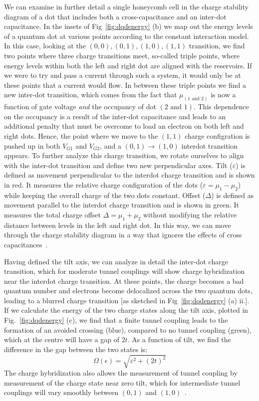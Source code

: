 We can examine in further detail a single honeycomb cell in the charge stability diagram of a dot that includes both a cross-capacitance and an inter-dot capacitance.
In the insets of Fig~\ref{fig:dqdenergy} (b) we map out the energy levels of a quantum dot at various points according to the constant interaction model.
In this case, looking at the $(0, 0), (0, 1), (1, 0), (1, 1)$ transition, we find two points where
three charge transitions meet, so-called triple points, where energy levels within both the left and right dot are aligned
with the reservoirs. If we were to try and pass a current through such a system, it would only be at these points that a
current would flow. In between these triple points we find a new inter-dot transition, which comes from the fact that $\mu_{(1 \textrm{~and~} 2)}$
is now a function of gate voltage \emph{and} the occupancy of dot $(2 \textrm{~and~} 1)$. This dependence on the
occupancy is a result of the inter-dot capacitance and leads to an additional penalty that must be
overcome to load an electron on both left and right dots. Hence, the point where we move to the $(1, 1)$ charge configration is
pushed up in both $V_{G1}$ and $V_{G2}$, and a $(0, 1) \rightarrow (1, 0)$ interdot transition appears. To further analyze this charge transition,
we rotate ourselves to align with the inter-dot transition and define two new perpendicular axes.
Tilt ($\varepsilon$) is defined as movement perpendicular to the interdot charge transition and is shown in red. It measures the relative
charge configuration of the dots ($\varepsilon = \mu_1 - \mu_2$) while keeping the overall charge of the two dots constant.
Offset ($\Delta$) is defined as movement parallel to the interdot charge transition and is shown in green.
It measures the total charge offset $\Delta = \mu_1 + \mu_2$ without modifying the relative distance between levels in the left
and right dot. In this way, we can move through the charge stability diagram in a way that ignores the effects of cross capacitances~\cite{qubyte}.

Having defined the tilt axis, we can analyze in detail the inter-dot charge transition, which for moderate tunnel couplings will show
charge hybridization near the interdot charge transition. At these points, the charge becomes a bad quantum number and electrons become delocalized
across the two quantum dots, leading to a blurred charge transition [as sketched in Fig~\ref{fig:dqdenergy} (a) ii.]. If we calculate the energy
of the two charge states along the tilt axis, plotted in Fig.~\ref{fig:dqdenergy} (c), we find that a finite tunnel coupling leads to the
formation of an avoided crossing (blue), compared to no tunnel coupling (green), which at the centre will have a gap of $2t$. As a function of
tilt, we find the difference in the gap between the two states is:
\begin{equation}
  \Omega(\epsilon) = \sqrt{\varepsilon^2 + (2 t)^2}
\end{equation}
The charge hybridization also allows the measurement of tunnel coupling by measurement of the charge state near zero tilt,
which for intermediate tunnel couplings will vary smoothly between $(0, 1)$ and $(1, 0)$~\cite{PhysRevLett.92.226801}.

